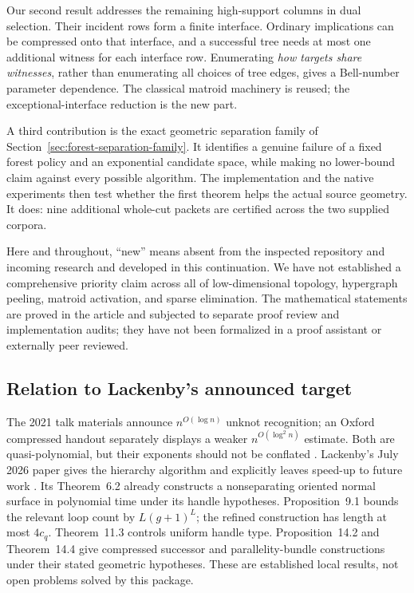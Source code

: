 Our second result addresses the remaining high-support columns in dual
selection.  Their incident rows form a finite interface.  Ordinary
implications can be compressed onto that interface, and a successful tree
needs at most one additional witness for each interface row.  Enumerating
\emph{how targets share witnesses}, rather than enumerating all choices of
tree edges, gives a Bell-number parameter dependence.  The classical
matroid machinery is reused; the exceptional-interface reduction is the
new part.

A third contribution is the exact geometric separation family of
Section~\ref{sec:forest-separation-family}.  It identifies a genuine failure
of a fixed forest policy and an exponential candidate space, while making
no lower-bound claim against every possible algorithm.  The implementation
and the native experiments then test whether the first theorem helps the
actual source geometry.  It does: nine additional whole-cut packets are
certified across the two supplied corpora.

Here and throughout, ``new'' means absent from the inspected repository
and incoming research and developed in this continuation.  We have not
established a comprehensive priority claim across all of low-dimensional
topology, hypergraph peeling, matroid activation, and sparse elimination.
The mathematical statements are proved in the article and subjected to
separate proof review and implementation audits; they have not been
formalized in a proof assistant or externally peer reviewed.

\subsection{Relation to Lackenby's announced target}

The 2021 talk materials announce $n^{O(\log n)}$ unknot recognition; an
Oxford compressed handout separately displays a weaker
$n^{O(\log^2 n)}$ estimate.  Both are quasi-polynomial, but their exponents
should not be conflated \cite{Lackenby2021,LackenbyOxford2021}.
Lackenby's July 2026 paper gives the hierarchy algorithm and explicitly
leaves speed-up to future work \cite{Lackenby2026}.  Its Theorem~6.2 already
constructs a nonseparating oriented normal surface in polynomial time
under its handle hypotheses.  Proposition~9.1 bounds the relevant loop
count by $L(g+1)^L$; the refined construction has length at most $4c_q$.
Theorem~11.3 controls uniform handle type.  Proposition~14.2 and
Theorem~14.4 give compressed successor and parallelity-bundle constructions
under their stated geometric hypotheses.  These are established local
results, not open problems solved by this package.

